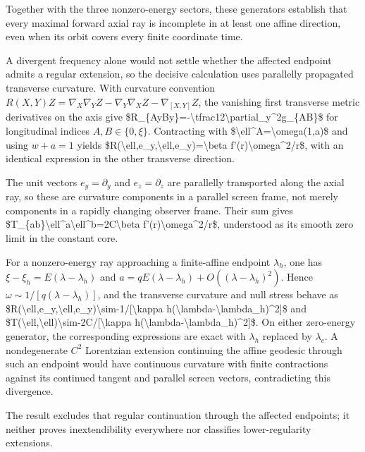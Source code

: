 \documentclass[11pt]{article}
\begin{document}
Together with the three nonzero-energy sectors, these generators establish that every maximal forward axial ray is incomplete in at least one affine direction, even when its orbit covers every finite coordinate time.

A divergent frequency alone would not settle whether the affected endpoint admits a regular extension, so the decisive calculation uses parallelly propagated transverse curvature. With curvature convention $R(X,Y)Z=\nabla_X\nabla_YZ-\nabla_Y\nabla_XZ-\nabla_{[X,Y]}Z$, the vanishing first transverse metric derivatives on the axis give \$R\_\{AyBy\}=-\textbackslash{}tfrac12\textbackslash{}partial\_y\textasciicircum{}2g\_\{AB\}\$ for longitudinal indices $A,B\in\{0,\xi\}$. Contracting with \$\textbackslash{}ell\textasciicircum{}A=\textbackslash{}omega(1,a)\$ and using $w+a=1$ yields \$R(\textbackslash{}ell,e\_y,\textbackslash{}ell,e\_y)=\textbackslash{}beta f'(r)\textbackslash{}omega\textasciicircum{}2/r\$, with an identical expression in the other transverse direction.

The unit vectors $e_y=\partial_y$ and $e_z=\partial_z$ are parallelly transported along the axial ray, so these are curvature components in a parallel screen frame, not merely components in a rapidly changing observer frame. Their sum gives \$T\_\{ab\}\textbackslash{}ell\textasciicircum{}a\textbackslash{}ell\textasciicircum{}b=2C\textbackslash{}beta f'(r)\textbackslash{}omega\textasciicircum{}2/r\$, understood as its smooth zero limit in the constant core.

For a nonzero-energy ray approaching a finite-affine endpoint $\lambda_h$, one has $\xi-\xi_h=E(\lambda-\lambda_h)$ and $a=qE(\lambda-\lambda_h)+O((\lambda-\lambda_h)^2)$. Hence $\omega\sim1/[q(\lambda-\lambda_h)]$, and the transverse curvature and null stress behave as \$R(\textbackslash{}ell,e\_y,\textbackslash{}ell,e\_y)\textbackslash{}sim-1/[\textbackslash{}kappa h(\textbackslash{}lambda-\textbackslash{}lambda\_h)\textasciicircum{}2]\$ and \$T(\textbackslash{}ell,\textbackslash{}ell)\textbackslash{}sim-2C/[\textbackslash{}kappa h(\textbackslash{}lambda-\textbackslash{}lambda\_h)\textasciicircum{}2]\$. On either zero-energy generator, the corresponding expressions are exact with $\lambda_h$ replaced by $\lambda_c$. A nondegenerate $C^2$ Lorentzian extension continuing the affine geodesic through such an endpoint would have continuous curvature with finite contractions against its continued tangent and parallel screen vectors, contradicting this divergence.

The result excludes that regular continuation through the affected endpoints; it neither proves inextendibility everywhere nor classifies lower-regularity extensions.
\end{document}
